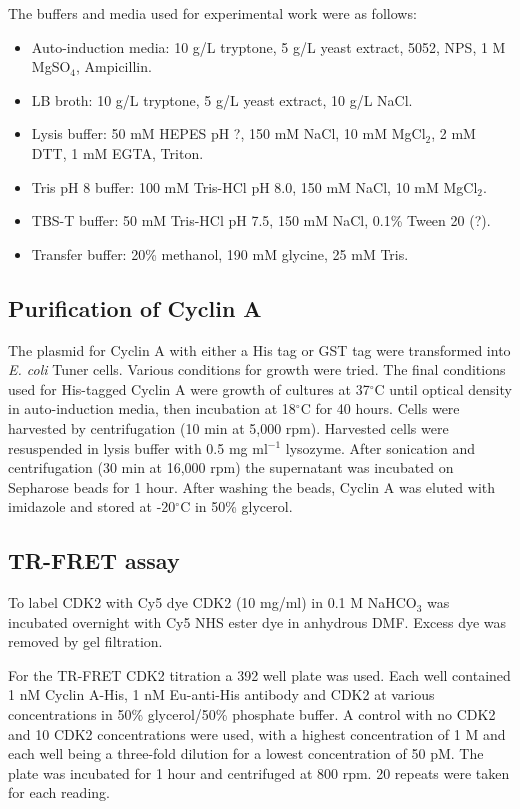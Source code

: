 The buffers and media used for experimental work were as follows:
\begin{itemize}
\item Auto-induction media: 10 g/L tryptone, 5 g/L yeast extract, 5052, NPS, 1 M MgSO$_{4}$, Ampicillin.
\item LB broth: 10 g/L tryptone, 5 g/L yeast extract, 10 g/L NaCl.
\item Lysis buffer: 50 mM HEPES pH ?, 150 mM NaCl, 10 mM MgCl$_{2}$, 2 mM DTT, 1 mM EGTA, Triton.
\item Tris pH 8 buffer: 100 mM Tris-HCl pH 8.0, 150 mM NaCl, 10 mM MgCl$_{2}$.
\item TBS-T buffer: 50 mM Tris-HCl pH 7.5, 150 mM NaCl, 0.1\% Tween 20 (?).
\item Transfer buffer: 20\% methanol, 190 mM glycine, 25 mM Tris.
\end{itemize}


\subsection{Purification of Cyclin A}

The plasmid for Cyclin A with either a His tag or GST tag were transformed into \textit{E. coli} Tuner cells.
Various conditions for growth were tried.
The final conditions used for His-tagged Cyclin A were growth of cultures at 37$^{\circ}$C until optical density in auto-induction media, then incubation at 18$^{\circ}$C for 40 hours.
Cells were harvested by centrifugation (10 min at 5,000 rpm).
Harvested cells were resuspended in lysis buffer with 0.5 mg ml$^{-1}$ lysozyme.
After sonication and centrifugation (30 min at 16,000 rpm) the supernatant was incubated on Sepharose beads for 1 hour.
After washing the beads, Cyclin A was eluted with imidazole and stored at -20$^{\circ}$C in 50\% glycerol.


\subsection{TR-FRET assay}

To label CDK2 with Cy5 dye CDK2 (10 mg/ml) in 0.1 M NaHCO$_{3}$ was incubated overnight with Cy5 NHS ester dye in anhydrous DMF.
Excess dye was removed by gel filtration.

For the TR-FRET CDK2 titration a 392 well plate was used.
Each well contained 1 nM Cyclin A-His, 1 nM Eu-anti-His antibody and CDK2 at various concentrations in 50\% glycerol/50\% phosphate buffer.
A control with no CDK2 and 10 CDK2 concentrations were used, with a highest concentration of 1 \textmu M and each well being a three-fold dilution for a lowest concentration of 50 pM.
The plate was incubated for 1 hour and centrifuged at 800 rpm.
20 repeats were taken for each reading.


